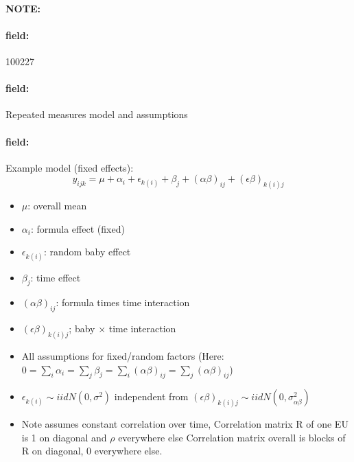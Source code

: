 \documentclass[12pt]{article}
\newenvironment{note}{\paragraph{NOTE:}}{}
\newenvironment{field}{\paragraph{field:}}{}
\begin{document}
\begin{note}
    \begin{field}
        \tiny 100227
    \end{field}
    \begin{field}
        Repeated measures model and assumptions
    \end{field}
    \begin{field}
      Example model (fixed effects):
      $$y_{ijk} = \mu + \alpha_i + \epsilon_{k(i)} + \beta_j + (\alpha\beta)_{ij} + (\epsilon\beta)_{k(i)j} $$
      \begin{itemize}
        \item $\mu$: overall mean
        \item $\alpha_i$: formula effect (fixed)
        \item $\epsilon_{k(i)}$: random baby effect
        \item $\beta_j$: time effect
        \item $(\alpha\beta)_{ij}$: formula times time interaction
        \item $(\epsilon\beta)_{k(i)j}$; baby $\times$ time interaction
        \item All assumptions for fixed/random factors (Here: $0 = \sum_i \alpha_i = \sum_j \beta_j = \sum_i (\alpha\beta)_{ij} = \sum_j(\alpha\beta)_{ij}$)
        \item $\epsilon_{k(i)} \sim iid N(0,\sigma^2)$ independent from $(\epsilon\beta)_{k(i)j} \sim iid N(0,\sigma_{\alpha\beta}^2)$
        \item Note assumes constant correlation over time, Correlation matrix R of one EU is 1 on diagonal and $\rho$ everywhere else Correlation matrix overall is blocks of R on diagonal, 0 everywhere else.
      \end{itemize}
    \end{field}
\end{note}
\end{document}
